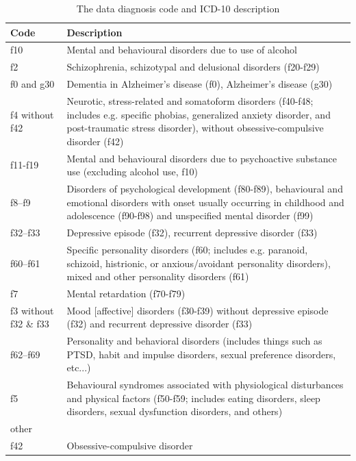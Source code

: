 \documentclass[
  openany]{book}
\theoremstyle{definition}
\theoremstyle{definition}
\theoremstyle{definition}
\theoremstyle{definition}
\theoremstyle{remark}
\begin{document}
\begin{table}
\centering
\caption{\label{tab:icd10}The data diagnosis code and ICD-10 description}
\centering
\begin{tabu} to 
\toprule
Code & Description\\
\midrule
f10 & Mental and behavioural disorders due to use of alcohol\\
f2 & Schizophrenia, schizotypal and delusional disorders (f20-f29)\\
f0 and g30 & Dementia in Alzheimer’s disease (f0), Alzheimer’s disease (g30)\\
f4 without f42 & Neurotic, stress-related and somatoform disorders (f40-f48; includes e.g. specific phobias, generalized anxiety disorder, and post-traumatic stress disorder), without obsessive-compulsive disorder (f42)\\
f11-f19 & Mental and behavioural disorders due to psychoactive substance use (excluding alcohol use, f10)\\
\addlinespace
f8–f9 & Disorders of psychological development (f80-f89), behavioural and emotional disorders with onset usually occurring in childhood and adolescence (f90-f98) and unspecified mental disorder (f99)\\
f32–f33 & Depressive episode (f32), recurrent depressive disorder (f33)\\
f60–f61 & Specific personality disorders (f60; includes e.g. paranoid, schizoid, histrionic, or anxious/avoidant personality disorders), mixed and other personality disorders (f61)\\
f7 & Mental retardation (f70-f79)\\
f3 without f32 \& f33 & Mood [affective] disorders (f30-f39) without depressive episode (f32) and recurrent depressive disorder (f33)\\
\addlinespace
f62–f69 & Personality and behavioral disorders (includes things such as PTSD, habit and impulse disorders, sexual preference disorders, etc...)\\
f5 & Behavioural syndromes associated with physiological disturbances and physical factors (f50-f59; includes eating disorders, sleep disorders, sexual dysfunction disorders, and others)\\
other & \\
f42 & Obsessive-compulsive disorder\\
\bottomrule
\end{tabu}
\end{table}
\end{document}

